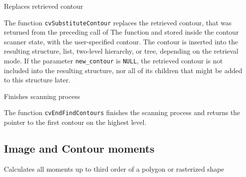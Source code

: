 Replaces retrieved contour


\begin{description}
\end{description}

The function \texttt{cvSubstituteContour} replaces the retrieved
contour, that was returned from the preceding call of The function
 and stored inside the contour scanner
state, with the user-specified contour. The contour is inserted
into the resulting structure, list, two-level hierarchy, or tree,
depending on the retrieval mode. If the parameter \texttt{new\_contour}
is \texttt{NULL}, the retrieved contour is not included into the
resulting structure, nor all of its children that might be added
to this structure later.

\label{EndFindContours}

Finishes scanning process


\begin{description}
\end{description}

The function \texttt{cvEndFindContours} finishes the scanning process and returns the pointer to the first contour on the highest level.


\subsection{Image and Contour moments}

\label{Moments}

Calculates all moments up to third order of a polygon or rasterized shape



